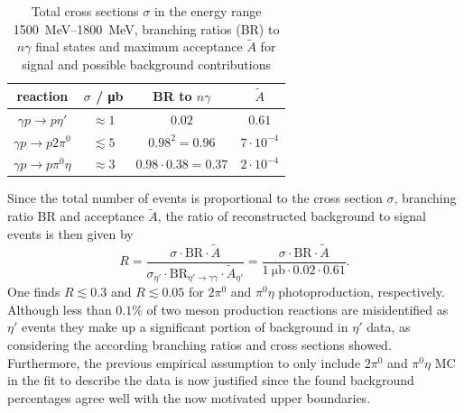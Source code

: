 \begin{table}[htbp]
	\centering
	\begin{tabular}{cccc}
		\toprule
		reaction & $\sigma$ / \si{\micro\barn} & BR to $n\gamma$ & $\tilde{A}$\\
		\hline
		$\gamma p\to p\eta'$ &$\approx1$ \cite{etap_cs}& $0.02$ & $0.61$\\
		$\gamma p\to p2\pi^0$ &$\lesssim5$ \cite{2pi0_cs}&$0.98^2=0.96$& $7\cdot 10^{-4}$\\
		$\gamma p\to p\pi^0\eta$ &$\approx3$ \cite{pi0eta_cs} &$0.98\cdot0.38=0.37$&$2\cdot 10^{-4}$\\
		\bottomrule 		
	\end{tabular}
\caption{Total cross sections $\sigma$ in the energy range \SIrange{1500}{1800}{\mega\eV}, branching ratios (BR) to $n\gamma$ final states and maximum acceptance $\tilde{A}$ for signal and possible background contributions}
\label{tab:plausmc}
\end{table}


Since the total number of events is proportional to the cross section $\sigma$, branching ratio BR and acceptance $\tilde{A}$, the ratio of reconstructed background to signal events is then given by $$R=\frac{\sigma\cdot\text{BR}\cdot\tilde{A}}{\sigma_{\eta'}\cdot\text{BR}_{\eta'\to\gamma\gamma}\cdot\tilde{A}_{\eta'}}=\frac{\sigma\cdot\text{BR}\cdot\tilde{A}}{\SI{1}{\micro\barn}\cdot0.02\cdot0.61}.$$
One finds $R\lesssim0.3$ and $R\lesssim0.05$ for $2\pi^0$ and $\pi^0\eta$ photoproduction, respectively. Although less than $0.1\%$ of two meson production reactions are misidentified as $\eta'$ events they make up a significant portion of background in $\eta'$ data, as considering the according branching ratios and cross sections showed. Furthermore, the previous empirical assumption to only include $2\pi^0$ and $\pi^0\eta$ MC in the fit to describe the data is now justified since the found background percentages agree well with the now motivated upper boundaries.    
\newpage

